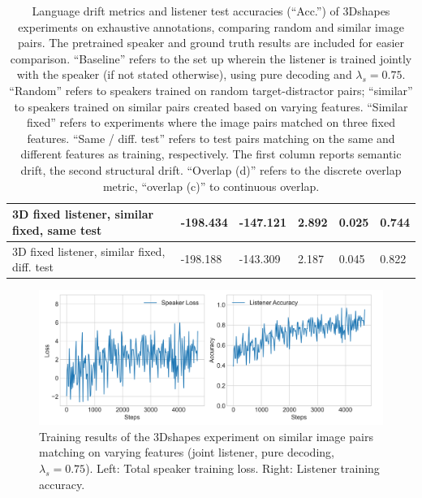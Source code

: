 \begin{table}[]
\begin{tabularx}{\textwidth}{|X|l|l|X|X|X|}
		3D fixed listener, similar fixed, same test &  -198.434       &      -147.121     &     2.892 &    0.025 &      0.744      \\ \hline
		3D fixed listener, similar fixed, diff. test & -198.188   & -143.309      & 2.187   & 0.045    & 0.822     \\ \hline
	\end{tabularx}
	\caption{\label{tab:3dshapes_drift_metrics_basic_similar}Language drift metrics and listener test accuracies (``Acc.'') of 3Dshapes experiments on exhaustive annotations, comparing random and similar image pairs. The pretrained speaker and ground truth results are included for easier comparison. ``Baseline'' refers to the set up wherein the listener is trained jointly with the speaker (if not stated otherwise), using pure decoding and $\lambda_s = 0.75$. ``Random'' refers to speakers trained on random target-distractor pairs; ``similar'' to speakers trained on similar pairs created based on varying features. ``Similar fixed'' refers to experiments where the image pairs matched on three fixed features. ``Same / diff. test'' refers to test pairs matching on the same and different features as training, respectively. The first column reports semantic drift, the second structural drift. ``Overlap (d)'' refers to the discrete overlap metric, ``overlap (c)'' to continuous overlap.}
\end{table}

\begin{figure}[h]
	\centering
	\includegraphics[width=\linewidth]{images/3dshapes_refgame_49_pure_075_similar.png}
	\caption{Training results of the 3Dshapes experiment on similar image pairs matching on varying features (joint listener, pure decoding, $\lambda_s = 0.75$). Left: Total speaker training loss. Right: Listener training accuracy.}
	\label{fig:3dshapes_similar_075_speaker_loss_listener_acc}
\end{figure}

